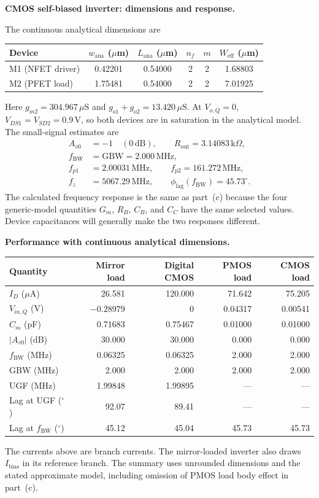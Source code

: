\documentclass[12pt,letterpaper]{article}
\newcommand{\uS}{\,\mu\mathrm{S}}
\newcommand{\kohm}{\,\mathrm{k}\Omega}
\newcommand{\V}{\,\mathrm{V}}
\newcommand{\MHz}{\,\mathrm{MHz}}
\begin{document}
\begin{enumerate}
\newpage
\textbf{CMOS self-biased inverter: dimensions and response.}

The continuous analytical dimensions are
\begin{center}
\small
\begin{tabular}{@{}lccccc@{}}
\toprule
Device & $w_{\mathrm{ana}}$ ($\mu$m) & $L_{\mathrm{ana}}$ ($\mu$m) & $n_f$ & $m$ & $W_{\mathrm{eff}}$ ($\mu$m)\\
\midrule
M1 (NFET driver) & 0.42201 & 0.54000 & 2 & 2 & 1.68803\\
M2 (PFET load) & 1.75481 & 0.54000 & 2 & 2 & 7.01925\\
\bottomrule
\end{tabular}
\end{center}
Here $g_{m2}=304.967\uS$ and
$g_{o1}+g_{o2}=13.420\uS$.
At $V_{o,Q}=0$, $V_{DS1}=V_{SD2}=0.9\V$, so both
devices are in saturation in the analytical model.
The small-signal estimates are
\begin{align*}
A_{v0}&=-1\quad(0\,\mathrm{dB}),\qquad
R_{\mathrm{out}}=3.14083\kohm,\\
f_{\mathrm{BW}}&=\mathrm{GBW}=2.000\MHz,\\
f_{p1}&=2.00031\MHz,\qquad f_{p2}=161.272\MHz,\\
f_z&=5067.29\MHz,\qquad
\phi_{\mathrm{lag}}(f_{\mathrm{BW}})=45.73^\circ.
\end{align*}
The calculated frequency response is the same as part~(c)
because the four generic-model quantities $G_m$, $R_B$, $C_B$,
and $C_C$ have the same selected values. Device
capacitances will generally make the two responses different.

\textbf{Performance with continuous analytical dimensions.}
\begin{center}
\small
\setlength{\tabcolsep}{4pt}
\begin{tabular}{@{}lrrrr@{}}
\toprule
Quantity & Mirror load & Digital CMOS & PMOS load & CMOS load\\
\midrule
$I_D$ ($\mu$A) & 26.581 & 120.000 & 71.642 & 75.205\\
$V_{in,Q}$ (V) & $-0.28979$ & 0 & 0.04317 & 0.00541\\
$C_m$ (pF) & 0.71683 & 0.75467 & 0.01000 & 0.01000\\
$|A_{v0}|$ (dB) & 30.000 & 30.000 & 0.000 & 0.000\\
$f_{\mathrm{BW}}$ (MHz) & 0.06325 & 0.06325 & 2.000 & 2.000\\
GBW (MHz) & 2.000 & 2.000 & 2.000 & 2.000\\
UGF (MHz) & 1.99848 & 1.99895 & --- & ---\\
Lag at UGF ($^\circ$) & 92.07 & 89.41 & --- & ---\\
Lag at $f_{\mathrm{BW}}$ ($^\circ$) & 45.12 & 45.04 & 45.73 & 45.73\\
\bottomrule
\end{tabular}
\end{center}
The currents above are branch currents. The mirror-loaded
inverter also draws $I_{\mathrm{bias}}$ in its reference branch.
The summary uses unrounded dimensions and the stated approximate
model, including omission of PMOS load body effect in part~(c).


\end{enumerate}
\end{document}

